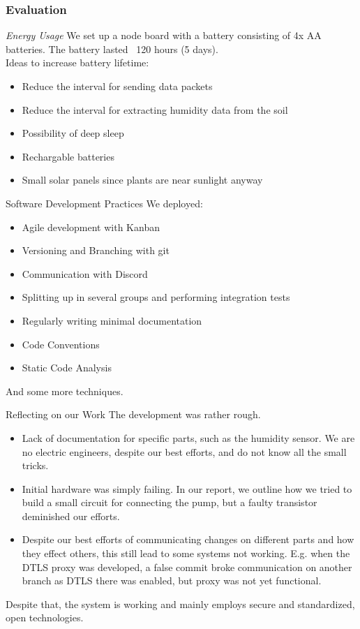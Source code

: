 \documentclass[10pt, xcolor=svgnames]{beamer}
\begin{document}
\begin{frame}
    \frametitle{Evaluation}
    \emph{Energy Usage} We set up a node board with a battery consisting of 4x AA batteries.
    The battery lasted ~120 hours (5 days).\\
    Ideas to increase battery lifetime: 
    \begin{itemize}
        \item Reduce the interval for sending data packets
        \item Reduce the interval for extracting humidity data from the soil
        \item Possibility of deep sleep
        \item Rechargable batteries
        \item Small solar panels since plants are near sunlight anyway
    \end{itemize}
\end{frame}

\begin{frame}{Software Development Practices}
    We deployed:
    \begin{itemize}
        \item Agile development with Kanban
        \item Versioning and Branching with git
        \item Communication with Discord
        \item Splitting up in several groups and performing integration tests
        \item Regularly writing minimal documentation
        \item Code Conventions
        \item Static Code Analysis
    \end{itemize}
    And some more techniques.
\end{frame}

\begin{frame}{Reflecting on our Work}
    The development was rather rough.
    \begin{itemize}
        \item Lack of documentation for specific parts, such as the humidity sensor. We are no electric engineers, despite our best efforts, and do not know all the small tricks.
        \item Initial hardware was simply failing. In our report, we outline how we tried to build a small circuit for connecting the pump, but a faulty transistor deminished our efforts.
        \item Despite our best efforts of communicating changes on different parts and how they effect others, this still lead to some systems not working. E.g. when the DTLS proxy was developed, a false commit broke communication on another branch as DTLS there was enabled, but proxy was not yet functional.
    \end{itemize}

    Despite that, the system is working and mainly employs secure and standardized, open technologies.
\end{frame}
\end{document}
